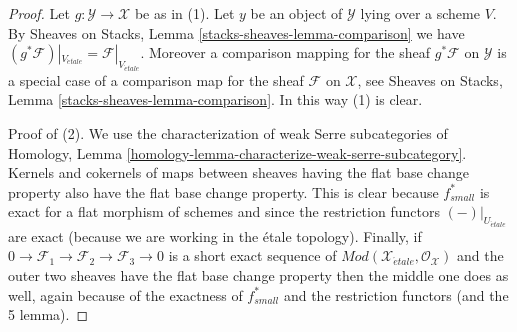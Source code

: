 \documentclass{stacks-project}
\theoremstyle{plain}
\theoremstyle{definition}
\theoremstyle{remark}
\numberwithin{equation}{subsection}
\def\etale{{\acute{e}tale}}
\begin{document}
\begin{proof}
Let $g : \mathcal{Y} \to \mathcal{X}$ be as in (1).
Let $y$ be an object of $\mathcal{Y}$ lying over a scheme $V$. By
Sheaves on Stacks, Lemma \ref{stacks-sheaves-lemma-comparison}
we have
$(g^*\mathcal{F})|_{V_\etale} = \mathcal{F}|_{V_\etale}$.
Moreover a comparison mapping for the sheaf $g^*\mathcal{F}$ on $\mathcal{Y}$
is a special case of a comparison map for the sheaf $\mathcal{F}$ on
$\mathcal{X}$, see
Sheaves on Stacks, Lemma \ref{stacks-sheaves-lemma-comparison}.
In this way (1) is clear.

\medskip\noindent
Proof of (2). We use the characterization of weak Serre subcategories of
Homology, Lemma \ref{homology-lemma-characterize-weak-serre-subcategory}.
Kernels and cokernels of
maps between sheaves having the flat base change property
also have the flat base change property. This is clear because
$f_{small}^*$ is exact for a flat morphism of schemes and since the
restriction functors $(-)|_{U_\etale}$ are exact (because we
are working in the \'etale topology). Finally, if
$0 \to \mathcal{F}_1 \to \mathcal{F}_2 \to \mathcal{F}_3 \to 0$
is a short exact sequence of
$\textit{Mod}(\mathcal{X}_\etale, \mathcal{O}_\mathcal{X})$
and the outer two sheaves have the flat base change property then
the middle one does as well, again because of the exactness of
$f_{small}^*$ and the restriction functors (and the 5 lemma).


\end{proof}
\end{document}
